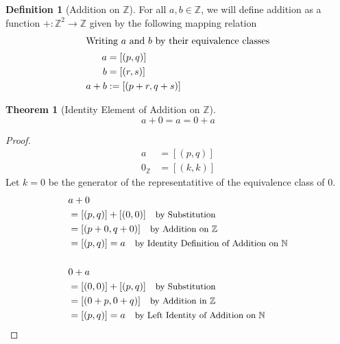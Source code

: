 \documentclass[12pt]{article}
\newcommand{\stext}[1]{\quad\text{\small #1}}
\theoremstyle{definition}
\newtheorem{theorem}{Theorem}
\newtheorem{definition}{Definition}
\begin{document}
\begin{definition}[Addition on $\mathbb{Z}$] 
    For all $a, b \in \mathbb{Z}$, we will define addition as a function $+: \mathbb{Z}^2 \to \mathbb{Z}$ given by the following mapping relation
    \begin{align*}
        \intertext{Writing $a$ and $b$ by their equivalence classes}
        a &= [(p, q)] \\
        b &= [(r, s)] \\ 
        a + b &:= [(p + r, q + s)]
    \end{align*}
\end{definition}

\begin{theorem}[Identity Element of Addition on $\mathbb{Z}$]
    \begin{equation*}
        a + 0 = a = 0 + a
    \end{equation*}
\end{theorem}
\begin{proof}
    \begin{align*}
        a &= [(p, q)] \\ 
        0_{\mathbb{Z}} &= [(k, k)]
    \end{align*}
    Let $k = 0$ be the generator of the representatitive of the equivalence class of $0$.
    \begin{align*}
        & a + 0 \\
        &= [(p, q)] + [(0, 0)] \stext{by Substitution}\\
        &=[(p + 0, q + 0)] \stext{by Addition on $\mathbb{Z}$} \\ 
        &= [(p, q)] = a \stext{by Identity Definition of Addition on $\mathbb{N}$} \\ \\
        & 0 + a \\ 
        &= [(0, 0)] + [(p, q)] \stext{by Substitution}\\
        &=[(0 + p, 0 + q)] \stext{by Addition in $\mathbb{Z}$} \\ 
        &= [(p, q)] = a \stext{by Left Identity of Addition on $\mathbb{N}$}
    \end{align*}
\end{proof}
\end{document}
